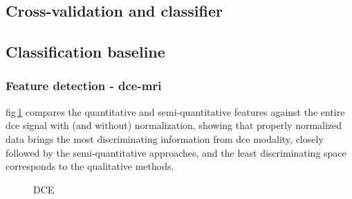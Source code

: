 \documentclass[a4paper,num-refs]{wiley-article}
\begin{document}
\subsection{Cross-validation and classifier}

\subsection{Classification baseline}\label{exp:feat_det}

\subsubsection{Feature detection - \Ac{dce}-\ac{mri}}

\Acl{fig}\,\ref{fig:DCE-norm} compares the quantitative and semi-quantitative
features against the entire \ac{dce} signal with (and without) normalization,
showing that properly normalized data brings the most discriminating information
from \ac{dce} modality, closely followed by the semi-quantitative approaches,
and the least discriminating space corresponds to the qualitative methods.

\begin{figure}
  \hspace*{\fill}
  \hfill
  \hspace*{\fill}
  \caption[DCE] {DCE}
  \label{fig:DCE-norm}
\end{figure}
\end{document}
